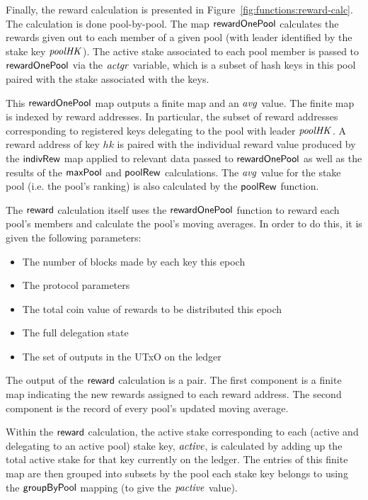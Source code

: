 Finally, the reward calculation is presented in
Figure~\ref{fig:functions:reward-calc}. The calculation is done pool-by-pool.
The map $\mathsf{rewardOnePool}$ calculates the rewards given out to each member
of a given pool (with leader identified by
the stake key $\mathit{poolHK}$). The active stake associated to each
pool member is passed to $\mathsf{rewardOnePool}$
via the $\mathit{actgr}$ variable, which is a subset of hash keys in this pool
paired with the stake associated with the keys.

This $\mathsf{rewardOnePool}$ map outputs a finite map and an $\mathit{avg}$
value. The finite map is indexed
by reward addresses. In particular, the subset of reward addresses corresponding
to registered keys delegating to the pool with leader $\mathit{poolHK}$.
A reward address of key $hk$ is paired with the individual reward value
produced by the $\mathsf{indivRew}$ map applied to relevant data passed to
$\mathsf{rewardOnePool}$ as well as the results of the $\mathsf{maxPool}$
and $\mathsf{poolRew}$ calculations. The $\mathit{avg}$ value for the stake pool
(i.e. the pool's ranking) is also calculated by the $\mathsf{poolRew}$ function.

The $\mathsf{reward}$ calculation itself uses the $\mathsf{rewardOnePool}$ function to
reward each pool's members and calculate the pool's moving averages. In order to
do this, it is given the following parameters:

\begin{itemize}
\item The number of blocks made by each key this epoch
\item The protocol parameters
\item The total coin value of rewards to be distributed this epoch
\item The full delegation state
\item The set of outputs in the UTxO on the ledger
\end{itemize}

The output of the $\mathsf{reward}$ calculation is a pair. The first component is
a finite map indicating the new rewards assigned to each reward address.
The second component is the record of every pool's updated moving average.

Within the $\mathsf{reward}$ calculation, the active stake corresponding to each
(active and delegating to an active pool) stake key, $\mathit{active}$, is
calculated by adding up the total active stake for that key currently on the
ledger. The entries of this finite map are then grouped into subsets by the pool
each stake key belongs to using the $\mathsf{groupByPool}$ mapping (to give the
$\mathit{pactive}$ value).

